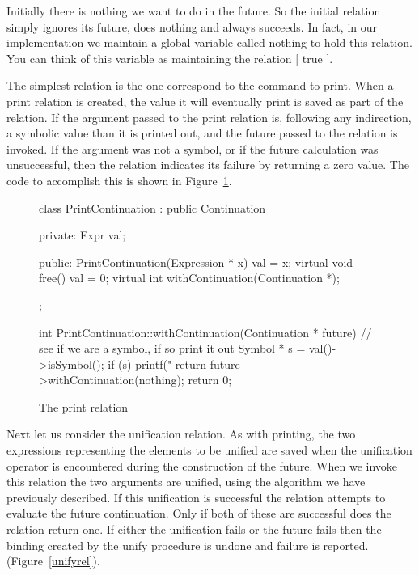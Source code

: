 Initially there is nothing we want to do in the future.  So the initial
relation simply ignores its future, does nothing and always succeeds.  In fact, 
in our implementation we maintain a
global variable called {\sf nothing} to hold this relation.  You can think
of this variable as maintaining the relation $[$ true $]$.

The simplest relation is the one correspond to the command to print.
When a print relation is created, the value it will eventually print is
saved as part of the relation.
If the argument passed to the print relation is, following any indirection,
a symbolic value than it is printed out, and the future passed to the
relation is invoked.  If the argument was not a symbol, or if the future
calculation was unsuccessful,
then the relation indicates its failure by returning a zero
value.  The code to accomplish this is shown in Figure~\ref{printrel}.

\begin{figure}
\begin{cprog}
class PrintContinuation : public Continuation {
private:
	Expr val;

public:
	PrintContinuation(Expression * x) { val = x; }
	virtual void free() { val = 0; }
	virtual int withContinuation(Continuation *);
};

int PrintContinuation::withContinuation(Continuation * future)
{
	// see if we are a symbol, if so print it out
	Symbol * s = val()->isSymbol();
	if (s) {
		printf("%
		return future->withContinuation(nothing);
		}
	return 0;
}
\end{cprog}
\caption{The print relation}\label{printrel}
\end{figure}

Next let us consider the unification relation.  As with printing, the two
expressions representing the elements to be unified are saved when the
unification operator is encountered during the construction of the future.  
When we invoke this relation the two
arguments are unified, using the algorithm we have previously described.
If this unification is successful the relation 
attempts to evaluate the future continuation.
Only if both of these are successful does
the relation return one.  If either the unification fails or the future
fails then the binding created by the {\sf unify} procedure is undone and
failure is reported.  (Figure~\ref{unifyrel}).

